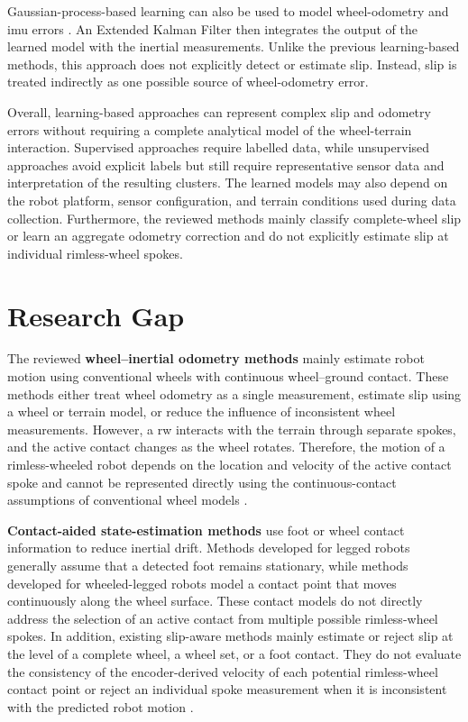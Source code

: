 \documentclass[report.tex]{subfiles}
\begin{document}
    Gaussian-process-based learning can also be used to model wheel-odometry and \gls{imu} errors \cite{Brossard2019}. An Extended Kalman Filter then integrates the output of the learned model with the inertial measurements. Unlike the previous learning-based methods, this approach does not explicitly detect or estimate slip. Instead, slip is treated indirectly as one possible source of wheel-odometry error.

    Overall, learning-based approaches can represent complex slip and odometry errors without requiring a complete analytical model of the wheel-terrain interaction. Supervised approaches require labelled data, while unsupervised approaches avoid explicit labels but still require representative sensor data and interpretation of the resulting clusters. The learned models may also depend on the robot platform, sensor configuration, and terrain conditions used during data collection. Furthermore, the reviewed methods mainly classify complete-wheel slip or learn an aggregate odometry correction and do not explicitly estimate slip at individual rimless-wheel spokes.
    
\section{Research Gap}
\label{sec:sota_gap}

    The reviewed \textbf{wheel--inertial odometry methods} mainly estimate robot motion using conventional wheels with continuous wheel--ground contact. These methods either treat wheel odometry as a single measurement, estimate slip using a wheel or terrain model, or reduce the influence of inconsistent wheel measurements. However, a \gls{rw} interacts with the terrain through separate spokes, and the active contact changes as the wheel rotates. Therefore, the motion of a rimless-wheeled robot depends on the location and velocity of the active contact spoke and cannot be represented directly using the continuous-contact assumptions of conventional wheel models \cite{Das2021, Liu2020, Ward2008, Gargiulo2021}.

    \textbf{Contact-aided state-estimation methods} use foot or wheel contact information to reduce inertial drift. Methods developed for legged robots generally assume that a detected foot remains stationary, while methods developed for wheeled-legged robots model a contact point that moves continuously along the wheel surface. These contact models do not directly address the selection of an active contact from multiple possible rimless-wheel spokes. In addition, existing slip-aware methods mainly estimate or reject slip at the level of a complete wheel, a wheel set, or a foot contact. They do not evaluate the consistency of the encoder-derived velocity of each potential rimless-wheel contact point or reject an individual spoke measurement when it is inconsistent with the predicted robot motion \cite{Hartley2018ContactAidedInEKF, Li2023, Zhou2025, Yoon2024, Kim2025}.
\end{document}
